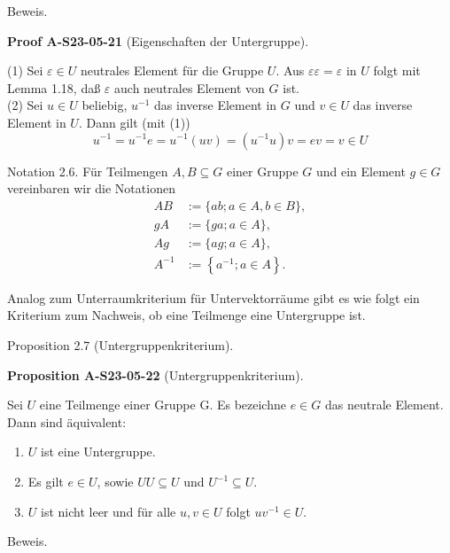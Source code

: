 \documentclass[10pt, letterpaper]{article}
\newcommand{\CustomHeading}[3]{%
  \par\medskip\noindent%
  \textbf{#1 #2} \textnormal{(#3)}.\enskip%
}
\newenvironment{PROP}[2]{\begin{unitbox}\CustomHeading{Proposition}{#1}{#2}}{\end{unitbox}}
\newenvironment{PROOF}[2]{\begin{unitbox}\CustomHeading{Proof}{#1}{#2}}{\end{unitbox}}
\begin{document}
Beweis. 

\begin{PROOF}{A-S23-05-21}{Eigenschaften der Untergruppe}
(1) Sei $\varepsilon \in U$ neutrales Element für die Gruppe $U$. Aus $\varepsilon \varepsilon=\varepsilon$ in $U$ folgt mit Lemma 1.18, daß $\varepsilon$ auch neutrales Element von $G$ ist.\\

(2) Sei $u \in U$ beliebig, $u^{-1}$ das inverse Element in $G$ und $v \in U$ das inverse Element in $U$. Dann gilt (mit (1))
$$
u^{-1}=u^{-1} e=u^{-1}(u v)=\left(u^{-1} u\right) v=e v=v \in U
$$
\end{PROOF}


Notation 2.6. Für Teilmengen $A, B \subseteq G$ einer Gruppe $G$ und ein Element $g \in G$ vereinbaren wir die Notationen
$$
\begin{aligned}
A B & :=\{a b ; a \in A, b \in B\}, \\
g A & :=\{g a ; a \in A\}, \\
A g & :=\{a g ; a \in A\}, \\
A^{-1} & :=\left\{a^{-1} ; a \in A\right\} .
\end{aligned}
$$

Analog zum Unterraumkriterium für Untervektorräume gibt es wie folgt ein Kriterium zum Nachweis, ob eine Teilmenge eine Untergruppe ist.

Proposition 2.7 (Untergruppenkriterium). 

\begin{PROP}{A-S23-05-22}{Untergruppenkriterium}
Sei $U$ eine Teilmenge einer Gruppe G. Es bezeichne $e \in G$ das neutrale Element. Dann sind äquivalent:\\
\begin{enumerate}[label=(\alph*)]
  \item $U$ ist eine Untergruppe.

  \item Es gilt $e \in U$, sowie $U U \subseteq U$ und $U^{-1} \subseteq U$.

  \item $U$ ist nicht leer und für alle $u, v \in U$ folgt $uv^{-1} \in U$.
\end{enumerate}
\end{PROP}


Beweis. 
\end{document}

